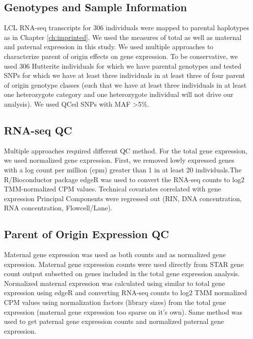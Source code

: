 \subsection{Genotypes and Sample Information}\label{Genotypes and Sample Information}
LCL RNA-seq transcripts for 306 individuals were mapped to parental haplotypes as in Chapter \ref{ch:imprinted}. We used the measures of total as well as maternal and paternal expression in this study. We used multiple approaches to characterize parent of origin effects on gene expression.
To be conservative, we used 306 Hutterite individuals for which we have parental genotypes and tested SNPs for which we have at least three individuals in at least three of four parent of origin genotype classes (such that we have at least three individuals in at least one heterozygote category and one heterozygote individual will not drive our analysis). We used QCed SNPs with MAF \textgreater 5\%.

\subsection{RNA-seq QC}\label{RNA-seq QC}
Multiple approaches required different QC method. For the total gene expression, we used normalized gene expression. First, we removed lowly expressed genes with a log count per million (cpm) greater than 1 in at least 20 individuals.The R/Bioconductor package edgeR was used to convert the RNA-seq counts to log2 TMM-normalized CPM values\cite{Robinson:2010dd,Robinson:2010cw}. Technical covariates correlated with gene expression Principal Components were regressed out (RIN, DNA concentration, RNA concentration, Flowcell/Lane). 

\subsection{Parent of Origin Expression QC}\label{Parent of Origin Expression QC}
Maternal gene expression was used as both counts and as normalized gene expression. Maternal gene expression counts were used directly from STAR gene count output\cite{Dobin:2002by} subsetted on genes included in the total gene expression analysis. 
Normalized maternal expression was calculated using similar to total gene expression using edgeR and converting RNA-seq counts to log2 TMM normalized CPM values using normalization factors (library sizes) from the total gene expression (maternal gene expression too sparse on it's own). 
Same method was used to get paternal gene expression counts and normalized paternal gene expression.


